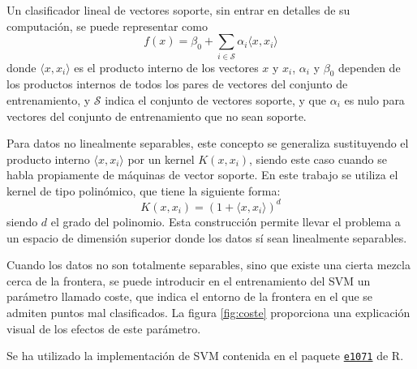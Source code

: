 \documentclass[12pt]{scrartcl}
\begin{document}
Un clasificador lineal de vectores soporte, sin entrar en detalles de su computación, se puede representar como
\begin{equation}
f(x) = \beta_0 + \sum_{i \in \mathcal{S}} \alpha_i \langle x,x_i \rangle
\end{equation}
donde $\langle x,x_i \rangle$ es el producto interno de los vectores $x$ y $x_i$, $\alpha_i$ y $\beta_0$ dependen de los productos internos de todos los pares de vectores del conjunto de entrenamiento, y $\mathcal{S}$ indica el conjunto de vectores soporte, y que $\alpha_i$ es nulo para vectores del conjunto de entrenamiento que no sean soporte.\par
Para datos no linealmente separables, este concepto se generaliza sustituyendo el producto interno $\langle x,x_i \rangle$ por un kernel $K(x,x_i)$, siendo este caso cuando se habla propiamente de máquinas de vector soporte. En este trabajo se utiliza el kernel de tipo polinómico, que tiene la siguiente forma:
\begin{equation}
K(x,x_i)=\left(1+\langle x,x_i \rangle \right)^d
\end{equation}
siendo $d$ el grado del polinomio. Esta construcción permite llevar el problema a un espacio de dimensión superior donde los datos sí sean linealmente separables.\par

Cuando los datos no son totalmente separables, sino que existe una cierta mezcla cerca de la frontera, se puede introducir en el entrenamiento del SVM un parámetro llamado coste, que indica el entorno de la frontera en el que se admiten puntos mal clasificados. La figura \ref{fig:coste} proporciona una explicación visual de los efectos de este parámetro.\par

Se ha utilizado la implementación de SVM contenida en el paquete \href{http://cran.r-project.org/web/packages/e1071/index.html}{\texttt{e1071}} de R.
\end{document}

